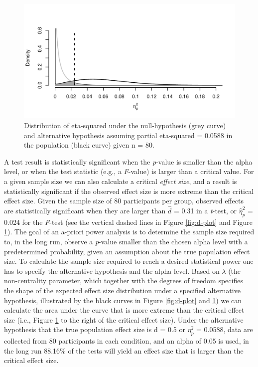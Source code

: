 \documentclass[
  english,
  ,jou,floatsintext]{apa6}
\begin{document}
\begin{figure}
\centering
\includegraphics{0.1_Simulation_Based_Power_Analysis_For_Factorial_ANOVA_Designs_files/figure-latex/eta-plot-1.pdf}
\caption{\label{fig:eta-plot}Distribution of eta-squared under the null-hypothesis (grey curve) and alternative hypothesis assuming partial eta-squared = 0.0588 in the population (black curve) given n = 80.}
\end{figure}

A test result is statistically significant when the \emph{p}-value is smaller than the alpha level, or when the test statistic (e.g., a \emph{F}-value) is larger than a critical value.
For a given sample size we can also calculate a critical \emph{effect size}, and a result is statistically significant if the observed effect size is more extreme than the critical effect size.
Given the sample size of 80 participants per group, observed effects are statistically significant when they are larger than \(\hat d\) = 0.31 in a \emph{t}-test, or \(\hat\eta_p^2\) = 0.024 for the \emph{F}-test (see the vertical dashed lines in Figure \ref{fig:d-plot} and Figure \ref{fig:eta-plot}).
The goal of an a-priori power analysis is to determine the sample size required to, in the long run, observe a \emph{p}-value smaller than the chosen alpha level with a predetermined probability, given an assumption about the true population effect size.
To calculate the sample size required to reach a desired statistical power one has to specify the alternative hypothesis and the alpha level.
Based on \(\lambda\) (the non-centrality parameter, which together with the degrees of freedom specifies the shape of the expected effect size distribution under a specified alternative hypothesis, illustrated by the black curves in Figure \ref{fig:d-plot} and \ref{fig:eta-plot}) we can calculate the area under the curve that is more extreme than the critical effect size (i.e., Figure \ref{fig:eta-plot} to the right of the critical effect size).
Under the alternative hypothesis that the true population effect size is d = 0.5 or \(\eta_p^2\) = 0.0588, data are collected from 80 participants in each condition, and an alpha of 0.05 is used, in the long run 88.16\% of the tests will yield an effect size that is larger than the critical effect size.
\end{document}
